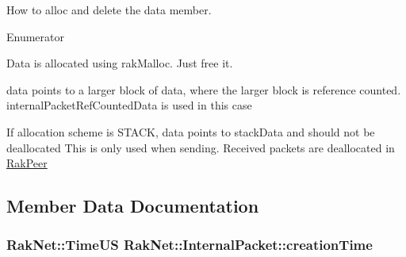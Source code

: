 How to alloc and delete the data member. 

\begin{Desc}
\item[Enumerator]\par
\begin{description}
\item[{\em 
\hypertarget{struct_rak_net_1_1_internal_packet_a902a05c67f6c8f288e33a9fb0015e196a9ca3b8805a0dc8d663e7fa4d4e3c9d07}{N\-O\-R\-M\-A\-L}\label{struct_rak_net_1_1_internal_packet_a902a05c67f6c8f288e33a9fb0015e196a9ca3b8805a0dc8d663e7fa4d4e3c9d07}
}]Data is allocated using rak\-Malloc. Just free it. \item[{\em 
\hypertarget{struct_rak_net_1_1_internal_packet_a902a05c67f6c8f288e33a9fb0015e196aa717b2fd02a6aea55a4a14bb7a1bd0e2}{R\-E\-F\-\_\-\-C\-O\-U\-N\-T\-E\-D}\label{struct_rak_net_1_1_internal_packet_a902a05c67f6c8f288e33a9fb0015e196aa717b2fd02a6aea55a4a14bb7a1bd0e2}
}]data points to a larger block of data, where the larger block is reference counted. internal\-Packet\-Ref\-Counted\-Data is used in this case \item[{\em 
\hypertarget{struct_rak_net_1_1_internal_packet_a902a05c67f6c8f288e33a9fb0015e196ae06da879d548a1826a18a1c9cbc3b9ca}{S\-T\-A\-C\-K}\label{struct_rak_net_1_1_internal_packet_a902a05c67f6c8f288e33a9fb0015e196ae06da879d548a1826a18a1c9cbc3b9ca}
}]If allocation scheme is S\-T\-A\-C\-K, data points to stack\-Data and should not be deallocated This is only used when sending. Received packets are deallocated in \hyperlink{class_rak_net_1_1_rak_peer}{Rak\-Peer} \end{description}
\end{Desc}


\subsection{Member Data Documentation}
\hypertarget{struct_rak_net_1_1_internal_packet_a742b1a6799000754513bd95193b30b09}{
\subsubsection[{creation\-Time}]{\setlength{\rightskip}{0pt plus 5cm}Rak\-Net\-::\-Time\-U\-S Rak\-Net\-::\-Internal\-Packet\-::creation\-Time}}\label{struct_rak_net_1_1_internal_packet_a742b1a6799000754513bd95193b30b09}


